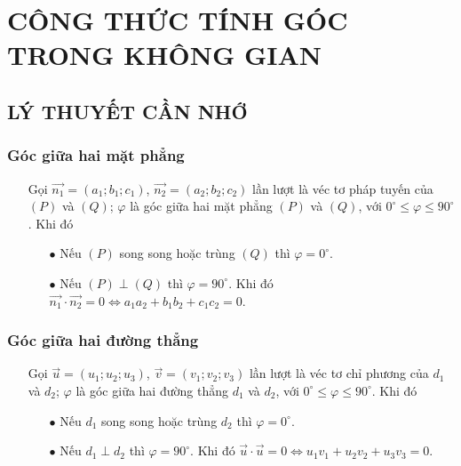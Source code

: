 \section{CÔNG THỨC TÍNH GÓC TRONG KHÔNG GIAN}
\subsection{LÝ THUYẾT CẦN NHỚ}
\subsubsection{Góc giữa hai mặt phẳng}
\begin{itemize}
	\item [\iconMT]  Gọi $\vec{n_1}=(a_1;b_1;c_1)$, $\vec{n_2}=(a_2;b_2;c_2)$ lần lượt là véc tơ pháp tuyến của $(P)$ và $(Q)$; $\varphi$ là góc giữa hai mặt phẳng $(P)$ và $(Q)$, với $0^\circ \leq \varphi \leq 90^\circ$.
	Khi đó
	\item [\iconMT] 
	\begin{itemize}
		\item [$\bullet$] Nếu $(P)$ song song hoặc trùng $(Q)$ thì $\varphi =0^\circ$.
		\item [$\bullet$] Nếu $(P)\perp (Q)$ thì $\varphi =90^\circ$. Khi đó $\vec{n_1}\cdot \vec{n_2}=0 \Leftrightarrow a_1a_2+b_1b_2+c_1c_2=0$.
	\end{itemize}
\end{itemize}
\subsubsection{Góc giữa hai đường thẳng}
\begin{itemize}
	\item [\iconMT]   Gọi $\vec{u}=(u_1;u_2;u_3)$, $\vec{v}=(v_1;v_2;v_3)$ lần lượt là véc tơ chỉ phương của  $d_1$ và $d_2$; $\varphi$ là góc giữa hai đường thẳng $d_1$ và $d_2$, với $0^\circ \leq \varphi \leq 90^\circ$.
	Khi đó
	\item [\iconMT] 
	\begin{itemize}
		\item [$\bullet$] Nếu $d_1$ song song hoặc trùng $d_2$ thì $\varphi =0^\circ$.
		\item [$\bullet$] Nếu $d_1\perp d_2$ thì $\varphi =90^\circ$. Khi đó $\vec{u} \cdot\vec{u} =0 \Leftrightarrow u_1v_1+u_2v_2+u_3v_3=0$.
	\end{itemize}
\end{itemize}

